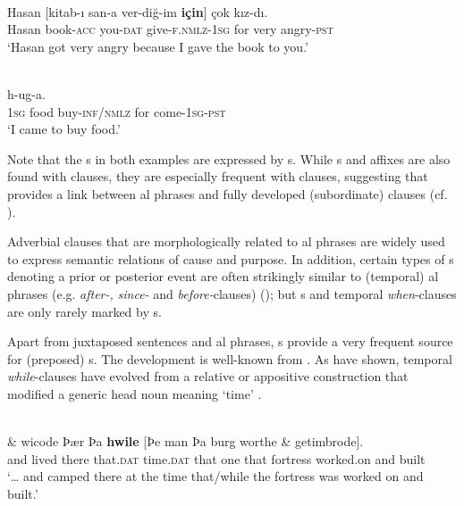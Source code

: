\documentclass[output=paper]{langsci/langscibook}
\begin{document}
\ea\label{ex:diessel:7}
\\
\gll   Hasan   [kitab-ı  san-a  ver-diğ-im  \textbf{için}]  çok  kız-dı.\\
       Hasan  book-\textsc{acc}  you-\textsc{dat}  give-\textsc{f.nmlz-1sg}  for  very  angry-\textsc{pst}  \\
\glt   `Hasan got very angry because I gave the book to you.'
\z

\ea\label{ex:diessel:8}
\\
  h-ug-a.\\
       \textsc{1sg}   food   buy-\textsc{inf/nmlz}  for  come-\textsc{1sg-pst}\\
\glt   `I came to buy food.'
\z

\noindent Note that the s in both examples are expressed by s. While s and  affixes are also found with  clauses, they are especially frequent with  clauses, suggesting that  provides a link between al phrases and fully developed (subordinate) clauses (cf. \citealt{Deutscher2009,Heine2009}).

Adverbial clauses that are morphologically related to al phrases are widely used to express semantic relations of cause and purpose. In addition, certain types of s denoting a prior or posterior event are often strikingly similar to (temporal) al phrases (e.g.  \textit{after-,} \textit{since-} and \textit{before-}clauses) (\citealt{Blake1999,Hetterle2015}); but s and temporal \textit{when}-clauses are only rarely marked by s. 

Apart from juxtaposed sentences and al phrases, s provide a very frequent source for (preposed) s. The development is well-known from . As \citet{HopperTraugott2003} have shown, temporal \textit{while}-clauses have evolved from a relative or appositive construction that modified a generic head noun meaning ‘time’ .

\ea\label{ex:diessel:9}
\\
\gll   \& wicode    Þær   Þa   \textbf{hwile}  [Þe   man  Þa   burg  worthe  \& getimbrode].\\
       and  lived   there   that.\textsc{dat}   time.\textsc{dat}  that   one  that   fortress  worked.on  and built\\
\glt `… and camped there at the time that/while the fortress was worked on and built.'
\z
\end{document}
